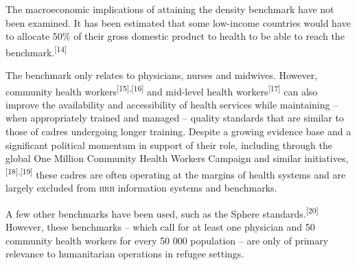 \documentclass{article}
\begin{document}
The macroeconomic implications of attaining the density benchmark have not been
examined. It has
been estimated that some low-income countries would have to allocate 50\% of
their gross domestic
product to health to be able to reach the
benchmark.\textsuperscript{[}\textsuperscript{14}\textsuperscript{]}

The benchmark only relates to physicians, nurses and midwives. However,
community health
workers\textsuperscript{[}\textsuperscript{15}\textsuperscript{]}\textsuperscript{,}\textsuperscript{[}\textsuperscript{16}\textsuperscript{]}
and mid-level health workers\textsuperscript{[}\textsuperscript{17}\textsuperscript{]}
can also improve the availability and accessibility of health services while
maintaining – when appropriately trained and managed – quality standards that
are
similar to those of cadres undergoing longer training. Despite a growing
evidence base and a
significant political momentum in support of their role, including through the
global One Million
Community Health Workers Campaign and similar
initiatives,\textsuperscript{[}\textsuperscript{18}\textsuperscript{]}\textsuperscript{,}\textsuperscript{[}\textsuperscript{19}\textsuperscript{]}
these cadres
are often operating at the margins of health systems and are largely excluded
from \textsc{hrh} information
systems and benchmarks.

A few other benchmarks have been used, such as the Sphere
standards.\textsuperscript{[}\textsuperscript{20}\textsuperscript{]}
However, these benchmarks – which call for at least one
physician and 50 community health workers for every 50 000 population – are only
of
primary relevance to humanitarian operations in refugee settings.
\end{document}
